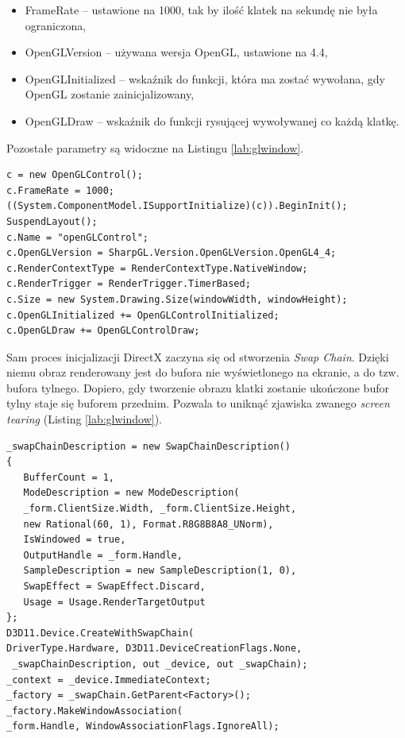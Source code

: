 \documentclass[archive]{mgr}
\begin{document}
\begin{itemize}
  \item FrameRate – ustawione na 1000, tak by ilość klatek na sekundę nie była ograniczona,
  \item OpenGLVersion – używana wersja OpenGL, ustawione na 4.4,
  \item OpenGLInitialized – wskaźnik do funkcji, która ma zostać wywołana, gdy OpenGL zostanie zainicjalizowany,
  \item OpenGLDraw – wskaźnik do funkcji rysującej wywoływanej co każdą klatkę.
\end{itemize}

Pozostałe parametry są widoczne na Listingu \ref{lab:glwindow}.

\begin{lstlisting}[caption={Tworzenie okna dla kontekstu OpenGL},captionpos=b,label={lab:glwindow}]
 c = new OpenGLControl();
c.FrameRate = 1000;
((System.ComponentModel.ISupportInitialize)(c)).BeginInit();
SuspendLayout();
c.Name = "openGLControl";
c.OpenGLVersion = SharpGL.Version.OpenGLVersion.OpenGL4_4;
c.RenderContextType = RenderContextType.NativeWindow;
c.RenderTrigger = RenderTrigger.TimerBased;
c.Size = new System.Drawing.Size(windowWidth, windowHeight);
c.OpenGLInitialized += OpenGLControlInitialized;
c.OpenGLDraw += OpenGLControlDraw;
\end{lstlisting}


Sam proces inicjalizacji DirectX zaczyna się od stworzenia \emph{Swap Chain}. Dzięki niemu obraz renderowany jest do bufora nie wyświetlonego na ekranie, a do tzw. bufora tylnego. Dopiero, gdy tworzenie obrazu klatki zostanie ukończone bufor tylny staje się buforem przednim. Pozwala to uniknąć zjawiska zwanego \emph{screen tearing} (Listing \ref{lab:glwindow}).
\begin{lstlisting}[caption={Definiowanie swap chainu},captionpos=b,label={lab:glwindow}]
_swapChainDescription = new SwapChainDescription()
{
   BufferCount = 1,
   ModeDescription = new ModeDescription(
   _form.ClientSize.Width, _form.ClientSize.Height,
   new Rational(60, 1), Format.R8G8B8A8_UNorm),
   IsWindowed = true,
   OutputHandle = _form.Handle,
   SampleDescription = new SampleDescription(1, 0),
   SwapEffect = SwapEffect.Discard,
   Usage = Usage.RenderTargetOutput
};
D3D11.Device.CreateWithSwapChain(
DriverType.Hardware, D3D11.DeviceCreationFlags.None,
 _swapChainDescription, out _device, out _swapChain);
_context = _device.ImmediateContext;
_factory = _swapChain.GetParent<Factory>();
_factory.MakeWindowAssociation(
_form.Handle, WindowAssociationFlags.IgnoreAll);
\end{lstlisting}
\end{document}
